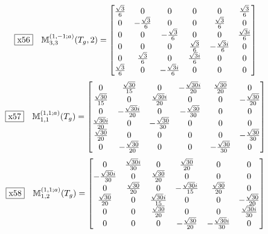 \documentclass[fleqn,10pt,landscape]{jsarticle}
\begin{document}
\begin{dmath*}
\fbox{x56}\quad \mathbb{M}_{3,3}^{(1,-1;a)}(T_{g},2)=\begin{bmatrix} \frac{\sqrt{3}}{6} & 0 & 0 & 0 & 0 & \frac{\sqrt{3}}{6} \\ 0 & - \frac{\sqrt{3}}{6} & 0 & 0 & \frac{\sqrt{3}}{6} & 0 \\ 0 & 0 & - \frac{\sqrt{3}}{6} & 0 & 0 & \frac{\sqrt{3} i}{6} \\ 0 & 0 & 0 & \frac{\sqrt{3}}{6} & - \frac{\sqrt{3} i}{6} & 0 \\ 0 & \frac{\sqrt{3}}{6} & 0 & \frac{\sqrt{3} i}{6} & 0 & 0 \\ \frac{\sqrt{3}}{6} & 0 & - \frac{\sqrt{3} i}{6} & 0 & 0 & 0 \end{bmatrix}
\end{dmath*}
\begin{dmath*}
\fbox{x57}\quad \mathbb{M}_{1,1}^{(1,1;a)}(T_{g})=\begin{bmatrix} 0 & \frac{\sqrt{30}}{15} & 0 & - \frac{\sqrt{30} i}{20} & \frac{\sqrt{30}}{20} & 0 \\ \frac{\sqrt{30}}{15} & 0 & \frac{\sqrt{30} i}{20} & 0 & 0 & - \frac{\sqrt{30}}{20} \\ 0 & - \frac{\sqrt{30} i}{20} & 0 & - \frac{\sqrt{30}}{30} & 0 & 0 \\ \frac{\sqrt{30} i}{20} & 0 & - \frac{\sqrt{30}}{30} & 0 & 0 & 0 \\ \frac{\sqrt{30}}{20} & 0 & 0 & 0 & 0 & - \frac{\sqrt{30}}{30} \\ 0 & - \frac{\sqrt{30}}{20} & 0 & 0 & - \frac{\sqrt{30}}{30} & 0 \end{bmatrix}
\end{dmath*}
\begin{dmath*}
\fbox{x58}\quad \mathbb{M}_{1,2}^{(1,1;a)}(T_{g})=\begin{bmatrix} 0 & \frac{\sqrt{30} i}{30} & 0 & \frac{\sqrt{30}}{20} & 0 & 0 \\ - \frac{\sqrt{30} i}{30} & 0 & \frac{\sqrt{30}}{20} & 0 & 0 & 0 \\ 0 & \frac{\sqrt{30}}{20} & 0 & - \frac{\sqrt{30} i}{15} & \frac{\sqrt{30}}{20} & 0 \\ \frac{\sqrt{30}}{20} & 0 & \frac{\sqrt{30} i}{15} & 0 & 0 & - \frac{\sqrt{30}}{20} \\ 0 & 0 & \frac{\sqrt{30}}{20} & 0 & 0 & \frac{\sqrt{30} i}{30} \\ 0 & 0 & 0 & - \frac{\sqrt{30}}{20} & - \frac{\sqrt{30} i}{30} & 0 \end{bmatrix}
\end{dmath*}
\end{document}
